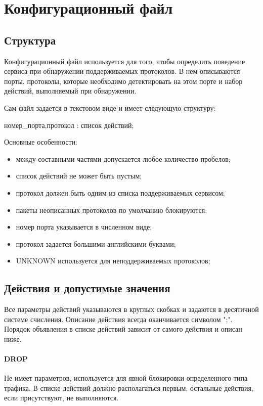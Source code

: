 \section{Конфигурационный файл}
\subsection{Структура}
Конфигурационный файл используется для того, чтобы определить поведение сервиса при обнаружении поддерживаемых протоколов. В нем описываются порты, протоколы, которые необходимо детектировать на этом порте и набор действий, выполняемый при обнаружении.

Сам файл задается в текстовом виде и имеет следующую структуру:
\begin{center}
номер\_порта,протокол : список действий;
\end{center}

Основные особенности:
\begin{itemize}
\item между составными частями допускается любое количество пробелов;
\item список действий не может быть пустым;
\item протокол должен быть одним из списка поддерживаемых сервисом;
\item пакеты неописанных протоколов по умолчанию блокируются;
\item номер порта указывается в численном виде;
\item протокол задается большими английскими буквами;
\item UNKNOWN используется для неподдерживаемых протоколов;
\end{itemize}

\subsection{Действия и допустимые значения}
Все параметры действий указываются в круглых скобках и задаются в десятичной системе счисления. Описание действия всегда оканчивается символом ";". Порядок объявления в списке действий зависит от самого действия и описан ниже.

\paragraph{DROP}

Не имеет параметров, используется для явной блокировки определенного типа трафика. В списке действий должно располагаться первым, остальные действия, если присутствуют, не выполняются.

